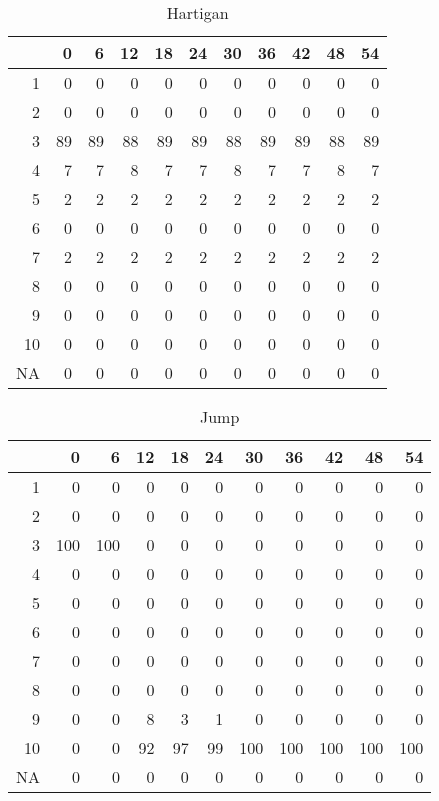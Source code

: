 \documentclass[11pt]{article}
\begin{document}
\begin{table}[H]
\centering
\begin{tabular}{rrrrrrrrrrr}
  \hline
 & 0 & 6 & 12 & 18 & 24 & 30 & 36 & 42 & 48 & 54 \\ 
  \hline
1 & 0 & 0 & 0 & 0 & 0 & 0 & 0 & 0 & 0 & 0 \\ 
  2 & 0 & 0 & 0 & 0 & 0 & 0 & 0 & 0 & 0 & 0 \\ 
  3 & 89 & 89 & 88 & 89 & 89 & 88 & 89 & 89 & 88 & 89 \\ 
  4 & 7 & 7 & 8 & 7 & 7 & 8 & 7 & 7 & 8 & 7 \\ 
  5 & 2 & 2 & 2 & 2 & 2 & 2 & 2 & 2 & 2 & 2 \\ 
  6 & 0 & 0 & 0 & 0 & 0 & 0 & 0 & 0 & 0 & 0 \\ 
  7 & 2 & 2 & 2 & 2 & 2 & 2 & 2 & 2 & 2 & 2 \\ 
  8 & 0 & 0 & 0 & 0 & 0 & 0 & 0 & 0 & 0 & 0 \\ 
  9 & 0 & 0 & 0 & 0 & 0 & 0 & 0 & 0 & 0 & 0 \\ 
  10 & 0 & 0 & 0 & 0 & 0 & 0 & 0 & 0 & 0 & 0 \\ 
  NA & 0 & 0 & 0 & 0 & 0 & 0 & 0 & 0 & 0 & 0 \\ 
   \hline
\end{tabular}
\caption{Hartigan} 
\end{table}
\begin{table}[H]
\centering
\begin{tabular}{rrrrrrrrrrr}
  \hline
 & 0 & 6 & 12 & 18 & 24 & 30 & 36 & 42 & 48 & 54 \\ 
  \hline
1 & 0 & 0 & 0 & 0 & 0 & 0 & 0 & 0 & 0 & 0 \\ 
  2 & 0 & 0 & 0 & 0 & 0 & 0 & 0 & 0 & 0 & 0 \\ 
  3 & 100 & 100 & 0 & 0 & 0 & 0 & 0 & 0 & 0 & 0 \\ 
  4 & 0 & 0 & 0 & 0 & 0 & 0 & 0 & 0 & 0 & 0 \\ 
  5 & 0 & 0 & 0 & 0 & 0 & 0 & 0 & 0 & 0 & 0 \\ 
  6 & 0 & 0 & 0 & 0 & 0 & 0 & 0 & 0 & 0 & 0 \\ 
  7 & 0 & 0 & 0 & 0 & 0 & 0 & 0 & 0 & 0 & 0 \\ 
  8 & 0 & 0 & 0 & 0 & 0 & 0 & 0 & 0 & 0 & 0 \\ 
  9 & 0 & 0 & 8 & 3 & 1 & 0 & 0 & 0 & 0 & 0 \\ 
  10 & 0 & 0 & 92 & 97 & 99 & 100 & 100 & 100 & 100 & 100 \\ 
  NA & 0 & 0 & 0 & 0 & 0 & 0 & 0 & 0 & 0 & 0 \\ 
   \hline
\end{tabular}
\caption{Jump} 
\end{table}
\end{document}
